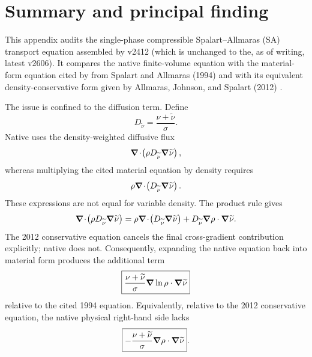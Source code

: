 \section{Summary and principal finding}
\label{sec:sa-summary}

This appendix audits the single-phase compressible Spalart--Allmaras (SA)
transport equation assembled by \SAOF{} v2412 (which is unchanged to the, as of writing, latest v2606).  It compares the native
finite-volume equation with the material-form equation cited by \SAOF{} from
Spalart and Allmaras (1994) and with its equivalent density-conservative form
given by Allmaras, Johnson, and Spalart (2012)
\cite{SpalartAllmaras1994,AJS2012}.

The issue is confined to the diffusion term.  Define
\[
  D_{\widetilde{\nu}}=\frac{\nu+\widetilde{\nu}}{\sigma}.
\]
Native \SAOF{} uses the density-weighted diffusive flux
\[
  \boldsymbol{\nabla}\!\cdot\!\left(
    \rho D_{\widetilde{\nu}}\boldsymbol{\nabla}\widetilde{\nu}
  \right),
\]
whereas multiplying the cited material equation by density requires
\[
  \rho\boldsymbol{\nabla}\!\cdot\!\left(
    D_{\widetilde{\nu}}\boldsymbol{\nabla}\widetilde{\nu}
  \right).
\]
These expressions are not equal for variable density.  The product rule gives
\[
  \boldsymbol{\nabla}\!\cdot\!\left(
    \rho D_{\widetilde{\nu}}\boldsymbol{\nabla}\widetilde{\nu}
  \right)
  =
  \rho\boldsymbol{\nabla}\!\cdot\!\left(
    D_{\widetilde{\nu}}\boldsymbol{\nabla}\widetilde{\nu}
  \right)
  +D_{\widetilde{\nu}}
   \boldsymbol{\nabla}\rho\mathbin{\cdot}\boldsymbol{\nabla}\widetilde{\nu}.
\]
The 2012 conservative equation cancels the final cross-gradient contribution
explicitly; native \SAOF{} does not.  Consequently, expanding the native
equation back into material form produces the additional term
\begin{equation}
  \boxed{
  \frac{\nu+\widetilde{\nu}}{\sigma}
  \boldsymbol{\nabla}\ln\rho\mathbin{\cdot}\boldsymbol{\nabla}\widetilde{\nu}}
  \label{eq:sa-summary-extra-term}
\end{equation}
relative to the cited 1994 equation.  Equivalently, relative to the 2012
conservative equation, the native physical right-hand side lacks
\begin{equation}
  \boxed{
  -\frac{\nu+\widetilde{\nu}}{\sigma}
  \boldsymbol{\nabla}\rho\mathbin{\cdot}\boldsymbol{\nabla}\widetilde{\nu}}.
  \label{eq:sa-summary-missing-term}
\end{equation}

